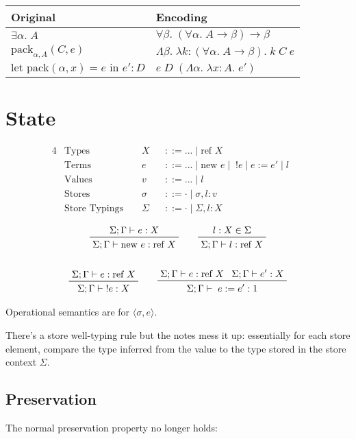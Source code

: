 \documentclass[a4paper,11pt]{article}
\begin{document}
{{        \begin{tabular}{l | l}
        Original & Encoding \\
        \hline
        \(\exists\alpha.\;A\) & \(\forall\beta.\;(\forall\alpha.\;A\rightarrow\beta)\rightarrow\beta\) \\
        \(\text{pack}_{\alpha,A}(C,e)\) & \(\Lambda\beta.\;\lambda k:(\forall\alpha.\;A\rightarrow\beta).\;k\;C\;e\) \\
        \(\text{let pack}(\alpha,x) = e\text{ in }e' : D\) & \(e\;D\;(\Lambda\alpha.\;\lambda x:A.\;e')\) \\
        \end{tabular}
    }
}
\section{State}
{

    \begin{alignat*}{4}
    &\text{Types } &&X &&::= ... \mid \text{ref }X && \\
    &\text{Terms } &&e &&::= ... \mid \text{new }e \mid\;!e \mid e := e' \mid l && \\
    &\text{Values } &&v &&::= ... \mid l && \\
    &\text{Stores } &&\sigma &&::= \cdot \mid \sigma,l:v && \\
    &\text{Store Typings } &&\Sigma &&::= \cdot \mid \Sigma,l:X &&
    \end{alignat*}
    
    \begin{gather*}
    \prftree[r]{}
    {\Sigma;\Gamma\vdash e:X}
    {\Sigma;\Gamma\vdash \text{new }e:\text{ref }X}
    \qquad
    \prftree[r]{}
    {l:X \in \Sigma}
    {\Sigma;\Gamma\vdash l : \text{ref }X}
    \\
    \\
    \prftree[r]{}
    {\Sigma;\Gamma\vdash e:\text{ref }X}
    {\Sigma;\Gamma\vdash\;!e:X}
    \qquad
    \prftree[r]{}
    {\Sigma;\Gamma\vdash e:\text{ref }X}
    {\Sigma;\Gamma\vdash e':X}
    {\Sigma;\Gamma\vdash\;e:=e':1}
    \end{gather*}

    Operational semantics are for \(\langle \sigma,e \rangle\).

    There's a store well-typing rule but the notes mess it up: essentially for each store element, compare the type
    inferred from the value to the type stored in the store context \(\Sigma\).

    \subsection*{Preservation}
    {
        The normal preservation property no longer holds:

}}
\end{document}
